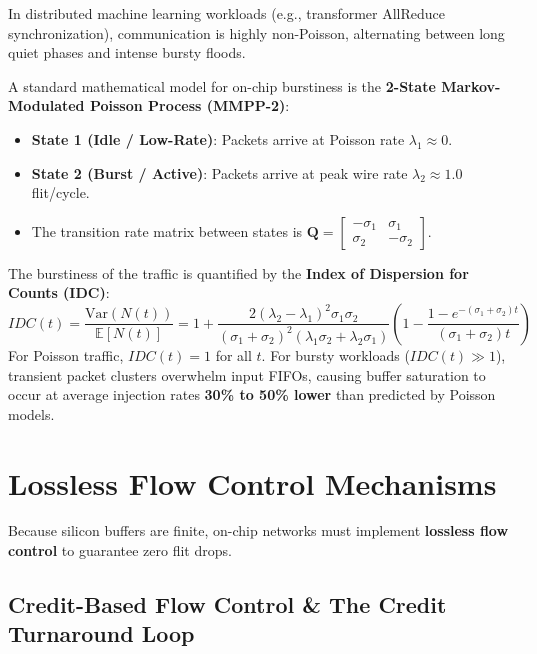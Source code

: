 In distributed machine learning workloads (e.g., transformer AllReduce synchronization), communication is highly non-Poisson, alternating between long quiet phases and intense bursty floods.

A standard mathematical model for on-chip burstiness is the \textbf{2-State Markov-Modulated Poisson Process (MMPP-2)}:
\begin{itemize}
    \item \textbf{State 1 (Idle / Low-Rate)}: Packets arrive at Poisson rate $\lambda_1 \approx 0$.
    \item \textbf{State 2 (Burst / Active)}: Packets arrive at peak wire rate $\lambda_2 \approx 1.0$ flit/cycle.
    \item The transition rate matrix between states is $\mathbf{Q} = \begin{bmatrix} -\sigma_1 & \sigma_1 \\ \sigma_2 & -\sigma_2 \end{bmatrix}$.
\end{itemize}

The burstiness of the traffic is quantified by the \textbf{Index of Dispersion for Counts (IDC)}:
\begin{equation}
IDC(t) = \frac{\text{Var}(N(t))}{\mathbb{E}[N(t)]} = 1 + \frac{2 (\lambda_2 - \lambda_1)^2 \sigma_1 \sigma_2}{(\sigma_1 + \sigma_2)^2 (\lambda_1 \sigma_2 + \lambda_2 \sigma_1)} \left(1 - \frac{1 - e^{-(\sigma_1 + \sigma_2)t}}{(\sigma_1 + \sigma_2)t}\right)
\label{eq:ch2_idc}
\end{equation}
For Poisson traffic, $IDC(t) = 1$ for all $t$. For bursty workloads ($IDC(t) \gg 1$), transient packet clusters overwhelm input FIFOs, causing buffer saturation to occur at average injection rates \textbf{30\% to 50\% lower} than predicted by Poisson models.

\section{Lossless Flow Control Mechanisms}
\label{sec:ch2_flow_control}

Because silicon buffers are finite, on-chip networks must implement \textbf{lossless flow control} to guarantee zero flit drops.

\subsection{Credit-Based Flow Control \& The Credit Turnaround Loop}
\label{subsec:ch2_credit_loop}

